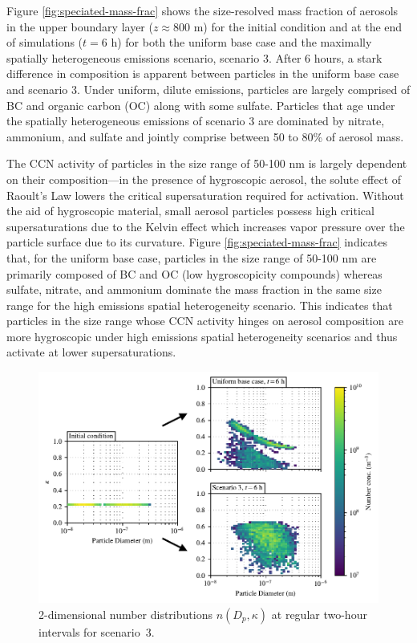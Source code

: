 \documentclass[journal abbreviation, manuscript]{copernicus}
\begin{document}
Figure \ref{fig:speciated-mass-frac} shows the size-resolved mass fraction of aerosols in the upper boundary layer ($z\approx 800$ m) for the initial condition and at the end of simulations ($t=6$ h) for both the uniform base case and the maximally spatially heterogeneous emissions scenario, scenario 3. After 6 hours, a stark difference in composition is apparent between particles in the uniform base case and scenario 3. Under uniform, dilute emissions, particles are largely comprised of BC and organic carbon (OC) along with some sulfate. Particles that age under the spatially heterogeneous emissions of scenario 3 are dominated by nitrate, ammonium, and sulfate and jointly comprise between 50 to 80\% of aerosol mass. 

The CCN activity of particles in the size range of 50-100 nm is largely dependent on their composition---in the presence of hygroscopic aerosol, the solute effect of Raoult's Law lowers the critical supersaturation required for activation. Without the aid of hygroscopic material, small aerosol particles possess high critical supersaturations due to the Kelvin effect which increases vapor pressure over the particle surface due to its curvature. Figure \ref{fig:speciated-mass-frac} indicates that, for the uniform base case, particles in the size range of 50-100 nm are primarily composed of BC and OC (low hygroscopicity compounds) whereas sulfate, nitrate, and ammonium dominate the mass fraction in the same size range for the high emissions spatial heterogeneity scenario. This indicates that particles in the size range whose CCN activity hinges on aerosol composition are more hygroscopic under high emissions spatial heterogeneity scenarios and thus activate at lower supersaturations.

\begin{figure}[!t]
	\centering
	\includegraphics[]{figures/2d-kappa-dist-three-panel-z40.pdf}
	\caption{2-dimensional number distributions $n(D_p, \kappa)$ at regular two-hour intervals for scenario~3.}
	\label{fig:kappa-dist}
\end{figure} 
\end{document}
